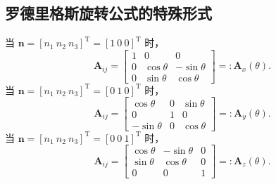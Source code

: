 \subsection{罗德里格斯旋转公式的特殊形式}
当 $\boldsymbol{n}=[n_1\ n_2\ n_3]^{\mathrm{T}}=[1\ 0\ 0]^{\mathrm{T}}$ 时，
\[
\boldsymbol{A}_{ij}=\begin{bmatrix}1&0&0\\0&\cos\theta&-\sin\theta\\0&\sin\theta&\cos\theta\end{bmatrix}=:\boldsymbol{A}_x(\theta).
\]
当 $\boldsymbol{n}=[n_1\ n_2\ n_3]^{\mathrm{T}}=[0\ 1\ 0]^{\mathrm{T}}$ 时，
\[
\boldsymbol{A}_{ij}=\begin{bmatrix}\cos\theta&0&\sin\theta\\0&1&0\\-\sin\theta&0&\cos\theta\end{bmatrix}=:\boldsymbol{A}_y(\theta).
\]
当 $\boldsymbol{n}=[n_1\ n_2\ n_3]^{\mathrm{T}}=[0\ 0\ 1]^{\mathrm{T}}$ 时，
\[
\boldsymbol{A}_{ij}=\begin{bmatrix}\cos\theta&-\sin\theta&0\\\sin\theta&\cos\theta&0\\0&0&1\end{bmatrix}=:\boldsymbol{A}_z(\theta).
\]
